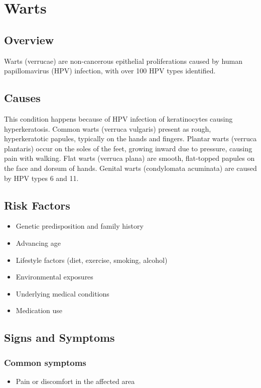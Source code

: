 \chapter{Warts}
\label{sec:Warts}

\section{Overview}
Warts (verrucae) are non-cancerous epithelial proliferations caused by human papillomavirus (HPV) infection, with over 100 HPV types identified.
\section{Causes}
This condition happens because of HPV infection of keratinocytes causing hyperkeratosis. Common warts (verruca vulgaris) present as rough, hyperkeratotic papules, typically on the hands and fingers. Plantar warts (verruca plantaris) occur on the soles of the feet, growing inward due to pressure, causing pain with walking. Flat warts (verruca plana) are smooth, flat-topped papules on the face and dorsum of hands. Genital warts (condylomata acuminata) are caused by HPV types 6 and 11.     
\section{Risk Factors}

\begin{itemize}[noitemsep]
  \item Genetic predisposition and family history
  \item Advancing age
  \item Lifestyle factors (diet, exercise, smoking, alcohol)
  \item Environmental exposures
  \item Underlying medical conditions
  \item Medication use
\end{itemize}
\section{Signs and Symptoms}

\subsection{Common symptoms}
\begin{itemize}[noitemsep]
  \item Pain or discomfort in the affected area
  \end{itemize}

